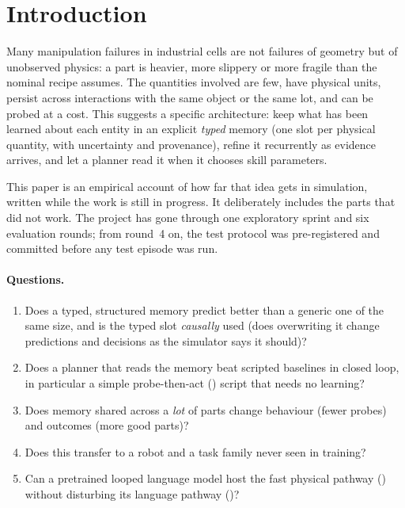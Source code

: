 \section{Introduction}
\label{sec:intro}

Many manipulation failures in industrial cells are not failures of geometry but of unobserved physics: a part
is heavier, more slippery or more fragile than the nominal recipe assumes. The quantities involved are
few, have physical units, persist across interactions with the same object or the same lot, and can be probed
at a cost. This suggests a specific architecture: keep what has been learned about each entity in an
explicit \emph{typed} memory (one slot per physical quantity, with uncertainty and provenance), refine it
recurrently as evidence arrives, and let a planner read it when it chooses skill parameters.

This paper is an empirical account of how far that idea gets in simulation, written while the work is still in
progress. It deliberately includes the parts that did not work. The project has gone through one exploratory
sprint and six evaluation rounds; from round~4 on, the test protocol was pre-registered and committed before any
test episode was run.

\paragraph{Questions.}
\begin{enumerate}
  \item Does a typed, structured memory predict better than a generic one of the same size, and is the typed
        slot \emph{causally} used (does overwriting it change predictions and decisions as the simulator says it
        should)?
  \item Does a planner that reads the memory beat scripted baselines in closed loop, in particular a simple
        probe-then-act (\pta{}) script that needs no learning?
  \item Does memory shared across a \emph{lot} of parts change behaviour (fewer probes) and outcomes (more good
        parts)?
  \item Does this transfer to a robot and a task family never seen in training?
  \item Can a pretrained looped language model host the fast physical pathway (\sysI) without disturbing its
        language pathway (\sysII)?
\end{enumerate}

